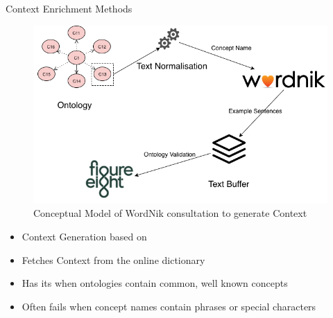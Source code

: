 \documentclass[final,hyperref={pdfpagelabels=true}]{beamer}
\begin{document}
\begin{frame}
\begin{columns}[t, onlytextwidth]
\begin{column}{\textwidth}
\begin{column}{\textwidth}
\begin{block}{Context Enrichment Methods}
\begin{minipage}[c]{\textwidth}
\begin{minipage}[t]{.3\linewidth}
						\begin{center}						
							\textsc{}
						\end{center}
						\vspace{1cm}
						\begin{figure}[H]
							 \centering
							 \includegraphics[width=\textwidth]{figures/External_Source_Workflow}
							 \caption{Conceptual Model of WordNik consultation to generate Context}
						\end{figure}
						
						\vspace{-1cm}
						\hrulefill
						
						\begin{itemize}
							\small
							\justifying
							\setlength\itemsep{1cm}
							\item Context Generation based on {}
							\item Fetches Context from the online dictionary {}
							\item Has its {} when ontologies contain common, well known concepts
							\item Often fails when concept names contain phrases or special characters
						\end{itemize}
					\end{minipage}
					\hfill
					\hbox{}
				\end{minipage}
				\vspace{1cm}
			\end{block}
		\end{column}
		

\end{column}
\end{columns}
\end{frame}
\end{document}
